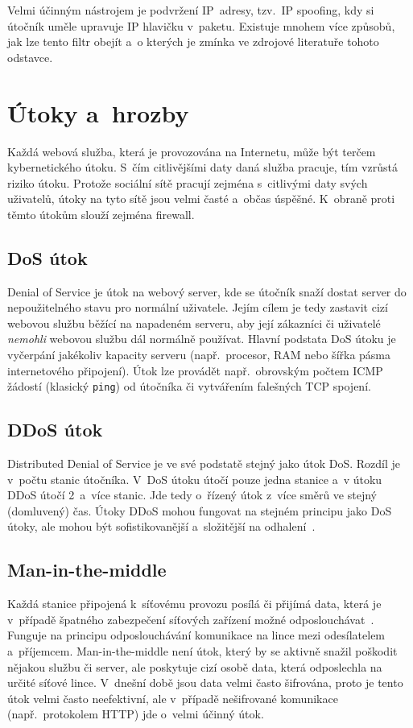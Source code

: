 Velmi účinným nástrojem je podvržení IP~adresy, tzv.~IP spoofing, kdy si útočník uměle upravuje IP hlavičku v~paketu. Existuje mnohem více způsobů, jak lze tento filtr obejít a~o kterých je zmínka ve zdrojové literatuře tohoto odstavce.

\section{Útoky a~hrozby}
Každá webová služba, která je provozována na Internetu, může být terčem kybernetického útoku. S~čím citlivějšími daty daná služba pracuje, tím vzrůstá riziko útoku. Protože sociální sítě pracují zejména s~citlivými daty svých uživatelů, útoky na tyto sítě jsou velmi časté a~občas úspěšné. K~obraně proti těmto útokům slouží zejména firewall.

\subsection*{DoS útok}
\label{sec:DoS_force}
Denial of Service je útok na webový server, kde se útočník snaží dostat server do nepoužitelného stavu pro normální uživatele. Jejím cílem je tedy zastavit cizí webovou službu běžící na napadeném serveru, aby její zákazníci či uživatelé \textit{nemohli} webovou službu dál normálně používat. Hlavní podstata DoS útoku je vyčerpání jakékoliv kapacity serveru (např.~procesor, RAM nebo šířka pásma internetového připojení). Útok lze provádět např.~obrovským počtem ICMP žádostí (klasický \texttt{ping}) od útočníka či vytvářením falešných TCP spojení.

\subsection*{DDoS útok}
\label{sec:DDoS_force}
Distributed Denial of Service je ve své podstatě stejný jako útok DoS. Rozdíl je v~počtu stanic útočníka. V~DoS útoku útočí pouze jedna stanice a~v útoku DDoS útočí 2~a~více stanic. Jde tedy o~řízený útok z~více směrů ve stejný (domluvený) čas. Útoky DDoS mohou fungovat na stejném principu jako DoS útoky, ale mohou být sofistikovanější a~složitější na odhalení~\cite{bib:ddos}. 

\subsection*{Man-in-the-middle}
Každá stanice připojená k~síťovému provozu posílá či přijímá data, která je v~případě špatného zabezpečení síťových zařízení možné odposlouchávat~\cite{bib:kyber_utoky}. Funguje na principu odposlouchávání komunikace na lince mezi odesílatelem a~příjemcem. Man-in-the-middle není útok, který by se aktivně snažil poškodit nějakou službu či server, ale poskytuje cizí osobě data, která odposlechla na určité síťové lince. V~dnešní době jsou data velmi často šifrována, proto je tento útok velmi často neefektivní, ale v~případě nešifrované komunikace (např.~protokolem HTTP) jde o~velmi účinný útok.

